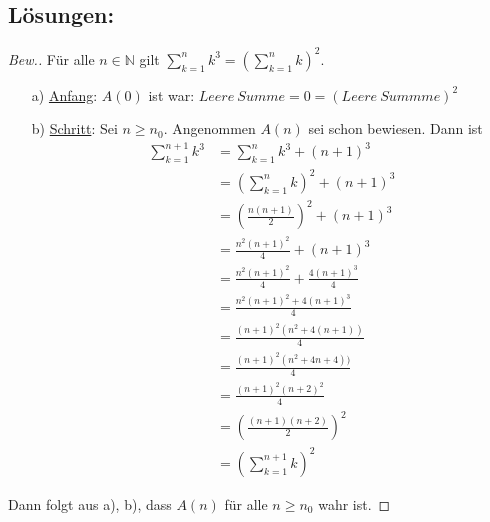 \documentclass{exam}
\begin{document}
        \subsection*{Lösungen:}
        \begin{proof}[Bew.] 
            Für alle $n \in \mathbb{N}$ gilt $\sum_{k = 1}^{n} k^3 = \left(\sum_{k = 1}^{n}k\right)^2$.
            \begin{enumerate}
                \item[a)] \underline{Anfang}: $A(0)$ ist war: $Leere\ Summe = 0 = (Leere\ Summme)^2$
                \item[b)] \underline{Schritt}: Sei $n \ge n_0$. Angenommen $A(n)$ sei schon bewiesen.
                    Dann ist \begin{align}
                        \sum_{k = 1}^{n + 1} k^3 &= \sum_{k = 1}^{n}k^3 + (n + 1)^3 \\ 
                        &= \left(\sum_{k = 1}^{n}k\right)^2 + (n + 1)^3 \tag{Gausische summenformel} \\
                        &= \left(\frac{n(n+1)}{2}\right)^2 + (n + 1)^3 \\ 
                        &= \frac{n^2(n+1)^2}{4} + (n + 1)^3 \\
                        &= \frac{n^2(n+1)^2}{4} + \frac{4(n + 1)^3}{4} \\
                        &= \frac{n^2(n+1)^2 + 4(n + 1)^3}{4} \\
                        &= \frac{(n+1)^2(n^2 + 4(n + 1))}{4} \\
                        &= \frac{(n+1)^2(n^2 + 4n + 4))}{4} \\
                        &= \frac{(n+1)^2(n +2)^2}{4} \\
                        &= \left(\frac{(n+1)(n +2)}{2}\right)^2 \\
                        &= \left(\sum_{k=1}^{n+1}k\right)^2 
                    \end{align}
            \end{enumerate}
            Dann folgt aus a), b), dass $A(n)$ für alle $n \ge n_0$ wahr ist.
        \end{proof}
\end{document}
